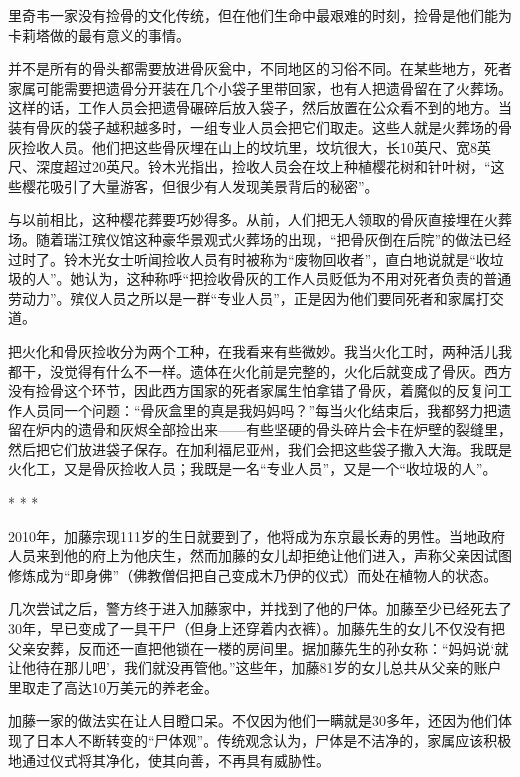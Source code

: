 \documentclass[12pt,oneside]{book}
\begin{document}
\begin{bookref}[frametitle={\cite{好好告别：世界葬礼观察手记}}]
里奇韦一家没有捡骨的文化传统，但在他们生命中最艰难的时刻，捡骨是他们能为卡莉塔做的最有意义的事情。

并不是所有的骨头都需要放进骨灰瓮中，不同地区的习俗不同。在某些地方，死者家属可能需要把遗骨分开装在几个小袋子里带回家，也有人把遗骨留在了火葬场。这样的话，工作人员会把遗骨碾碎后放入袋子，然后放置在公众看不到的地方。当装有骨灰的袋子越积越多时，一组专业人员会把它们取走。这些人就是火葬场的骨灰捡收人员。他们把这些骨灰埋在山上的坟坑里，坟坑很大，长10英尺、宽8英尺、深度超过20英尺。铃木光指出，捡收人员会在坟上种植樱花树和针叶树，“这些樱花吸引了大量游客，但很少有人发现美景背后的秘密”。

与以前相比，这种樱花葬要巧妙得多。从前，人们把无人领取的骨灰直接埋在火葬场。随着瑞江殡仪馆这种豪华景观式火葬场的出现，“把骨灰倒在后院”的做法已经过时了。铃木光女士听闻捡收人员有时被称为“废物回收者”，直白地说就是“收垃圾的人”。她认为，这种称呼“把捡收骨灰的工作人员贬低为不用对死者负责的普通劳动力”。殡仪人员之所以是一群“专业人员”，正是因为他们要同死者和家属打交道。

把火化和骨灰捡收分为两个工种，在我看来有些微妙。我当火化工时，两种活儿我都干，没觉得有什么不一样。遗体在火化前是完整的，火化后就变成了骨灰。西方没有捡骨这个环节，因此西方国家的死者家属生怕拿错了骨灰，着魔似的反复问工作人员同一个问题：“骨灰盒里的真是我妈妈吗？”每当火化结束后，我都努力把遗留在炉内的遗骨和灰烬全部捡出来——有些坚硬的骨头碎片会卡在炉壁的裂缝里，然后把它们放进袋子保存。在加利福尼亚州，我们会把这些袋子撒入大海。我既是火化工，又是骨灰捡收人员；我既是一名“专业人员”，又是一个“收垃圾的人”。

\begin{center}
* * *
\end{center}

2010年，加藤宗现111岁的生日就要到了，他将成为东京最长寿的男性。当地政府人员来到他的府上为他庆生，然而加藤的女儿却拒绝让他们进入，声称父亲因试图修炼成为“即身佛”（佛教僧侣把自己变成木乃伊的仪式）而处在植物人的状态。

几次尝试之后，警方终于进入加藤家中，并找到了他的尸体。加藤至少已经死去了30年，早已变成了一具干尸（但身上还穿着内衣裤）。加藤先生的女儿不仅没有把父亲安葬，反而还一直把他锁在一楼的房间里。据加藤先生的孙女称：“妈妈说‘就让他待在那儿吧’，我们就没再管他。”这些年，加藤81岁的女儿总共从父亲的账户里取走了高达10万美元的养老金。

加藤一家的做法实在让人目瞪口呆。不仅因为他们一瞒就是30多年，还因为他们体现了日本人不断转变的“尸体观”。传统观念认为，尸体是不洁净的，家属应该积极地通过仪式将其净化，使其向善，不再具有威胁性。


\end{bookref}
\end{document}
